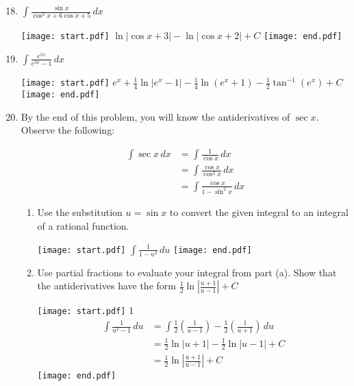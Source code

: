 \documentclass[12pt]{article}
\begin{document}

\begin{enumerate}
\setcounter{enumi}{17}

\item $\int \frac{\sin{x}}{\cos^2{x}+6\cos{x}+5} \,dx$

\texttt{[image: start.pdf]}
{{$\ln{|\cos{x}+3|}-\ln{|\cos{x}+2|}+C$}}
\texttt{[image: end.pdf]}


\item $\int \frac{e^{5x}}{e^{4x}-1} \,dx$

\texttt{[image: start.pdf]}
{{$e^{x}+\frac{1}{4}\ln|e^x-1|-\frac{1}{4}\ln(e^x+1)-\frac{1}{2}\tan^{-1}(e^x)+C$}}
\texttt{[image: end.pdf]}


\item By the end of this problem, you will know the antiderivatives of $\sec{x}$.  Observe the following:
\begin{center}
\begin{align*}
\int \sec{x} \,dx &= \int \frac{1}{\cos{x}} \,dx\\
&= \int \frac{\cos{x}}{\cos^2{x}} \,dx\\
&= \int \frac{\cos{x}}{1-\sin^2{x}} \,dx
\end{align*}
\end{center}
\begin{enumerate}

\item Use the substitution $u=\sin{x}$ to convert the given integral to an integral of a rational function.  

\texttt{[image: start.pdf]}
{{$\int \frac{1}{1-u^2} \,du$}}
\texttt{[image: end.pdf]}


\item Use partial fractions to evaluate your integral from part (a).  Show that the antiderivatives have the form $\frac{1}{2}\ln{\left|\frac{u+1}{u-1}\right|}+C$

\texttt{[image: start.pdf]}
{{{1\linewidth}{
\begin{align*}
\int \frac{1}{u^2-1}\,du &= \int \frac{1}{2}\left(\frac{1}{u-1}\right)-\frac{1}{2}\left(\frac{1}{u+1}\right) \,du\\
&=\frac{1}{2}\ln{|u+1|}-\frac{1}{2}\ln{|u-1|}+C\\
&=\frac{1}{2}\ln{\left|\frac{u+1}{u-1}\right|}+C
\end{align*}
}}}
\texttt{[image: end.pdf]}



\end{enumerate}
\end{enumerate}
\end{document}
